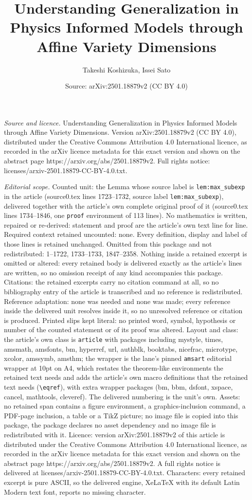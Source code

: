 \documentclass[10pt,a4paper]{amsart}
\title[Understanding Generalization in Physics Informed Models thro]{Understanding Generalization in Physics Informed Models through Affine Variety Dimensions}
\author{Takeshi Koshizuka, Issei Sato}
\date{Source: arXiv:2501.18879v2 (CC BY 4.0)}
\begin{document}
\maketitle

\noindent\emph{Source and licence.} Understanding Generalization in Physics Informed Models through Affine Variety Dimensions. Version arXiv:2501.18879v2 (CC BY 4.0), distributed under the Creative Commons Attribution 4.0 International licence, as recorded in the arXiv licence metadata for this exact version and shown on the abstract page https://arxiv.org/abs/2501.18879v2. Full rights notice: licenses/arxiv-2501.18879-CC-BY-4.0.txt.\par\smallskip

\noindent\textit{Editorial scope.} Counted unit: the Lemma whose source label is \texttt{lem:max\_subexp} in the article (source0.tex lines 1723--1732, source label \texttt{lem:max\_subexp}), delivered together with the article's own complete original proof of it (source0.tex lines 1734--1846, one \texttt{proof} environment of 113 lines). No mathematics is written, repaired or re-derived: statement and proof are the article's own text line for line. Required context retained uncounted: none. Every definition, display and label of those lines is retained unchanged. Omitted from this package and not redistributed: 1--1722, 1733--1733, 1847--2358. Nothing inside a retained excerpt is omitted or altered: every retained body is delivered exactly as the article's lines are written, so no omission receipt of any kind accompanies this package. Citations: the retained excerpts carry no citation command at all, so no bibliography entry of the article is transcribed and no reference is redistributed. Reference adaptation: none was needed and none was made; every reference inside the delivered unit resolves inside it, so no unresolved reference or citation is produced. Printed slips kept literal: no printed word, symbol, hypothesis or number of the counted statement or of its proof was altered. Layout and class: the article's own class is \texttt{article} with packages including mystyle, times, amsmath, amsfonts, bm, hyperref, url, authblk, booktabs, nicefrac, microtype, xcolor, amssymb, amsthm; the wrapper is the lane's pinned \texttt{amsart} editorial wrapper at 10pt on A4, which restates the theorem-like environments the retained text needs and adds the article's own macro definitions that the retained text needs (\texttt{\textbackslash eqref}), with extra wrapper packages (bm, bbm, dsfont, xspace, cancel, mathtools, cleveref). The delivered numbering is the unit's own. Assets: no retained span contains a figure environment, a graphics-inclusion command, a PDF-page inclusion, a table or a TikZ picture; no image file is copied into this package, the package declares no asset dependency and no image file is redistributed with it. Licence: version arXiv:2501.18879v2 of this article is distributed under the Creative Commons Attribution 4.0 International licence, as recorded in the arXiv licence metadata for this exact version and shown on the abstract page https://arxiv.org/abs/2501.18879v2. A full rights notice is delivered at licenses/arxiv-2501.18879-CC-BY-4.0.txt. Characters: every retained excerpt is pure ASCII, so the delivered engine, XeLaTeX with its default Latin Modern text font, reports no missing character.
\end{document}
